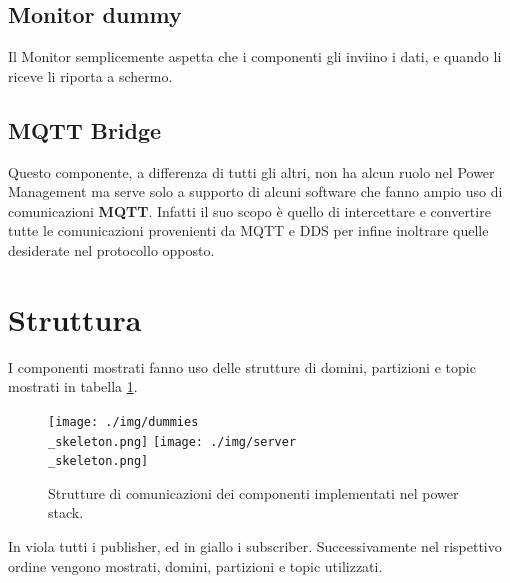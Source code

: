 \subsection*{Monitor dummy}
Il Monitor semplicemente aspetta che i componenti gli inviino i dati, e quando li riceve li riporta a schermo.

\subsection*{MQTT Bridge}
Questo componente, a differenza di tutti gli altri, non ha alcun ruolo nel Power Management ma serve solo a supporto di alcuni software che fanno ampio uso di comunicazioni \textbf{MQTT}\cite{mqtt}. Infatti il suo scopo è quello di intercettare e convertire tutte le comunicazioni provenienti da MQTT e DDS per infine inoltrare quelle desiderate nel protocollo opposto.%

\section{Struttura}
I componenti mostrati fanno uso delle strutture di domini, partizioni e topic mostrati in tabella \ref{fig:dummy_topic}.

\begin{figure}[H]
    \centering
    \texttt{[image: ./img/dummies\\\_skeleton.png]}
    \texttt{[image: ./img/server\\\_skeleton.png]}%
    \caption{ Strutture di comunicazioni dei componenti implementati nel power stack.}
    \label{fig:dummy_topic}
\end{figure}
In viola tutti i publisher, ed in giallo i subscriber. Successivamente nel rispettivo ordine vengono mostrati, domini, partizioni e topic utilizzati.
